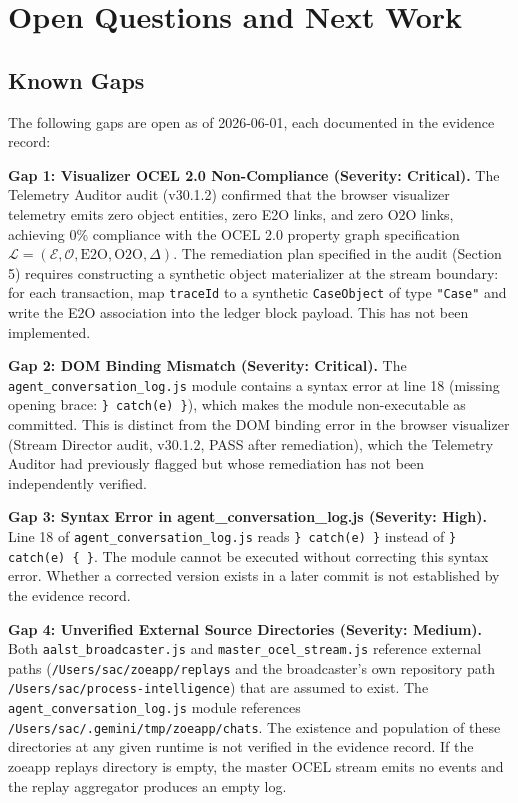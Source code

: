 
\section{Open Questions and Next Work}
\label{sec:livestream-open}

\subsection{Known Gaps}
\label{sec:livestream-open-gaps}

The following gaps are open as of 2026-06-01, each documented in the evidence
record:

\textbf{Gap 1: Visualizer OCEL 2.0 Non-Compliance (Severity: Critical).}
The Telemetry Auditor audit (v30.1.2) confirmed that the browser visualizer
telemetry emits zero object entities, zero E2O links, and zero O2O links, achieving
0\% compliance with the OCEL 2.0 property graph specification
$\mathcal{L} = (\mathcal{E}, \mathcal{O}, \text{E2O}, \text{O2O}, \Delta)$.
The remediation plan specified in the audit (Section 5) requires constructing a
synthetic object materializer at the stream boundary: for each transaction, map
\texttt{traceId} to a synthetic \texttt{CaseObject} of type \texttt{"Case"} and
write the E2O association into the ledger block payload. This has not been
implemented.

\textbf{Gap 2: DOM Binding Mismatch (Severity: Critical).}
The \texttt{agent\_conversation\_log.js} module contains a syntax error at line 18
(missing opening brace: \texttt{\} catch(e) \}}), which makes the module
non-executable as committed. This is distinct from the DOM binding error in the
browser visualizer (Stream Director audit, v30.1.2, PASS after remediation), which
the Telemetry Auditor had previously flagged but whose remediation has not been
independently verified.

\textbf{Gap 3: Syntax Error in agent\_conversation\_log.js (Severity: High).}
Line 18 of \texttt{agent\_conversation\_log.js} reads \texttt{\} catch(e) \}}
instead of \texttt{\} catch(e) \{\ \}}. The module cannot be executed without
correcting this syntax error. Whether a corrected version exists in a later commit
is not established by the evidence record.

\textbf{Gap 4: Unverified External Source Directories (Severity: Medium).}
Both \texttt{aalst\_broadcaster.js} and \texttt{master\_ocel\_stream.js} reference
external paths (\texttt{/Users/sac/zoeapp/replays} and the broadcaster's own
repository path \texttt{/Users/sac/process-intelligence}) that are assumed to exist.
The \texttt{agent\_conversation\_log.js} module references
\texttt{/Users/sac/.gemini/tmp/zoeapp/chats}. The existence and population of
these directories at any given runtime is not verified in the evidence record.
If the zoeapp replays directory is empty, the master OCEL stream emits no events
and the replay aggregator produces an empty log.

